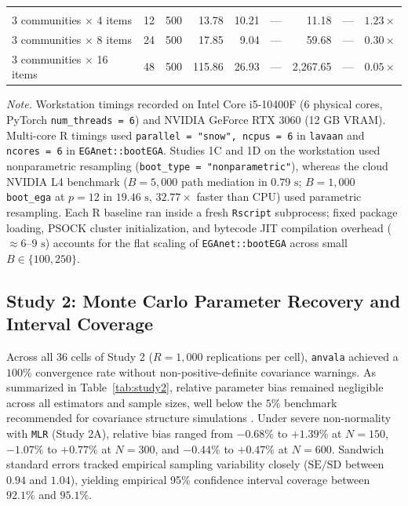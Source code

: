 ﻿\documentclass[12pt,letterpaper]{article}
\begin{document}
\begin{table}[htbp]
\begin{tabular}{lrrrrrrrr}
\addlinespace
\multicolumn{9}{l}{\textit{Study 1D: Nonparametric \texttt{boot\_ega} Dimensionality Scaling ($O(p^3)$)}} \\
3 communities $\times$ 4 items & 12 & 500 & 13.78 & 10.21 & --- & 11.18 & --- & $1.23\times$ \\
3 communities $\times$ 8 items & 24 & 500 & 17.85 & 9.04 & --- & 59.68 & --- & $0.30\times$ \\
3 communities $\times$ 16 items & 48 & 500 & 115.86 & 26.93 & --- & 2,267.65 & --- & $0.05\times$ \\
\bottomrule
\end{tabular}
\vspace{4pt}
\par\noindent\footnotesize\textit{Note.} Workstation timings recorded on Intel Core i5-10400F (6 physical cores, PyTorch \texttt{num\_threads = 6}) and NVIDIA GeForce RTX 3060 (12 GB VRAM). Multi-core R timings used \texttt{parallel = "snow", ncpus = 6} in \texttt{lavaan} and \texttt{ncores = 6} in \texttt{EGAnet::bootEGA}. Studies 1C and 1D on the workstation used nonparametric resampling (\texttt{boot\_type = "nonparametric"}), whereas the cloud NVIDIA L4 benchmark ($B = 5{,}000$ path mediation in $0.79\text{ s}$; $B = 1{,}000$ \texttt{boot\_ega} at $p = 12$ in $19.46\text{ s}$, $32.77\times$ faster than CPU) used parametric resampling. Each R baseline ran inside a fresh \texttt{Rscript} subprocess; fixed package loading, PSOCK cluster initialization, and bytecode JIT compilation overhead ($\approx 6\text{--}9\text{ s}$) accounts for the flat scaling of \texttt{EGAnet::bootEGA} across small $B \in \{100, 250\}$.
\end{table}

\subsection{Study 2: Monte Carlo Parameter Recovery and Interval Coverage}

Across all 36 cells of Study 2 ($R = 1{,}000$ replications per cell), \texttt{anvala} achieved a $100\%$ convergence rate without non-positive-definite covariance warnings. As summarized in Table~\ref{tab:study2}, relative parameter bias remained negligible across all estimators and sample sizes, well below the $5\%$ benchmark recommended for covariance structure simulations \parencite{hoogland1998}. Under severe non-normality with \texttt{MLR} (Study 2A), relative bias ranged from $-0.68\%$ to $+1.39\%$ at $N = 150$, $-1.07\%$ to $+0.77\%$ at $N = 300$, and $-0.44\%$ to $+0.47\%$ at $N = 600$. Sandwich standard errors tracked empirical sampling variability closely ($\overline{\mathrm{SE}}/\mathrm{SD}$ between $0.94$ and $1.04$), yielding empirical 95\% confidence interval coverage between $92.1\%$ and $95.1\%$.
\end{document}
